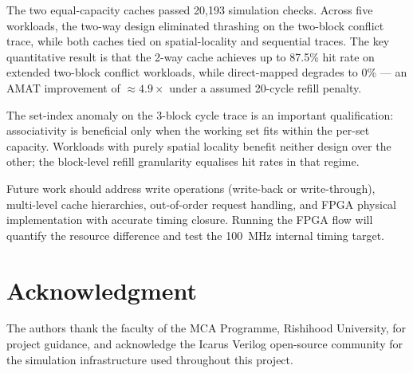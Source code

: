 \documentclass[conference]{IEEEtran}
\begin{document}
The two equal-capacity caches passed 20,193 simulation checks.
Across five workloads, the two-way design eliminated thrashing on the
two-block conflict trace, while both caches tied on spatial-locality
and sequential traces.
The key quantitative result is that the 2-way cache achieves up to 87.5\%
hit rate on extended two-block conflict workloads, while direct-mapped
degrades to 0\%  — an AMAT improvement of $\approx\!4.9\times$ under a
assumed 20-cycle refill penalty.

The set-index anomaly on the 3-block cycle trace is an important
qualification: associativity is beneficial only when the working set fits
within the per-set capacity.
Workloads with purely spatial locality benefit neither design over the other;
the block-level refill granularity equalises hit rates in that regime.

Future work should address write operations (write-back or write-through),
multi-level cache hierarchies, out-of-order request handling, and FPGA
physical implementation with accurate timing closure.
Running the FPGA flow will quantify the resource difference and test
the 100~MHz internal timing target.

\section*{Acknowledgment}

The authors thank the faculty of the MCA Programme, Rishihood University,
for project guidance, and acknowledge the Icarus Verilog open-source
community \cite{icarus-verilog} for the simulation infrastructure used
throughout this project.



\end{document}
